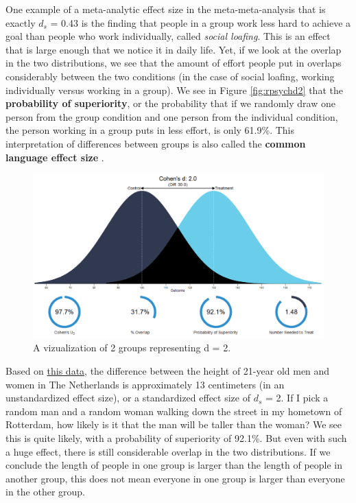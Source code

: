 \documentclass[
]{krantz}
\begin{document}
One example of a meta-analytic effect size in the meta-meta-analysis that is exactly \(d_s\) = 0.43 is the finding that people in a group work less hard to achieve a goal than people who work individually, called \emph{social loafing}. This is an effect that is large enough that we notice it in daily life. Yet, if we look at the overlap in the two distributions, we see that the amount of effort people put in overlaps considerably between the two conditions (in the case of social loafing, working individually versus working in a group). We see in Figure \ref{fig:rpsychd2} that the \textbf{probability of superiority}, or the probability that if we randomly draw one person from the group condition and one person from the individual condition, the person working in a group puts in less effort, is only 61.9\%. This interpretation of differences between groups is also called the \textbf{common language effect size} \citep{mcgraw_common_1992}.

\begin{figure}

{\centering \includegraphics[width=1\linewidth]{images/rpsychd3} 

}

\caption{A vizualization of 2 groups representing d = 2.}\label{fig:rpsychd3}
\end{figure}

Based on \href{http://www.nature.com/pr/journal/v73/n3/full/pr2012189a.html}{this data}, the difference between the height of 21-year old men and women in The Netherlands is approximately 13 centimeters (in an unstandardized effect size), or a standardized effect size of \(d_s\) = 2. If I pick a random man and a random woman walking down the street in my hometown of Rotterdam, how likely is it that the man will be taller than the woman? We see this is quite likely, with a probability of superiority of 92.1\%. But even with such a huge effect, there is still considerable overlap in the two distributions. If we conclude the length of people in one group is larger than the length of people in another group, this does not mean everyone in one group is larger than everyone in the other group.
\end{document}
